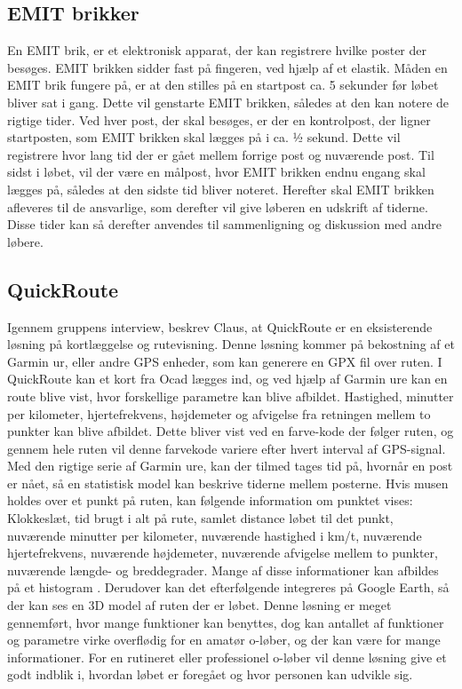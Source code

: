 \subsection{EMIT brikker}
En EMIT brik, er et elektronisk apparat, der kan registrere hvilke poster der besøges. EMIT brikken sidder fast på fingeren, ved hjælp af et elastik. \newline
Måden en EMIT brik fungere på, er at den stilles på en startpost ca. 5 sekunder før løbet bliver sat i gang. Dette vil genstarte EMIT brikken, således at den kan notere de rigtige tider. 
Ved hver post, der skal besøges, er der en kontrolpost, der ligner startposten, som EMIT brikken skal lægges på i ca. ½ sekund. Dette vil registrere hvor lang tid der er gået mellem forrige post og nuværende post. \newline
Til sidst i løbet, vil der være en målpost, hvor EMIT brikken endnu engang skal lægges på, således at den sidste tid bliver noteret. 
Herefter skal EMIT brikken afleveres til de ansvarlige, som derefter vil give løberen en udskrift af tiderne. Disse tider kan så derefter anvendes til sammenligning og diskussion med andre løbere. \citep{OOK}

\subsection{QuickRoute}
Igennem gruppens interview, beskrev Claus, at QuickRoute er en eksisterende løsning på kortlæggelse og rutevisning. Denne løsning kommer på bekostning af et Garmin ur, eller andre GPS enheder, som kan generere en GPX fil over ruten. I QuickRoute kan et kort fra Ocad lægges ind, og ved hjælp af Garmin ure kan en route blive vist, hvor forskellige parametre kan blive afbildet. Hastighed, minutter per kilometer, hjertefrekvens, højdemeter og afvigelse fra retningen mellem to punkter kan blive afbildet. Dette bliver vist ved en farve-kode der følger ruten, og gennem hele ruten vil denne farvekode variere efter hvert interval af GPS-signal. Med den rigtige serie af Garmin ure, kan der tilmed tages tid på, hvornår en post er nået, så en statistisk model kan beskrive tiderne mellem posterne. Hvis musen holdes over et punkt på ruten, kan følgende information om punktet vises: Klokkeslæt, tid brugt i alt på rute, samlet distance løbet til det punkt, nuværende minutter per kilometer, nuværende hastighed i km/t, nuværende hjertefrekvens, nuværende højdemeter, nuværende afvigelse mellem to punkter, nuværende længde- og breddegrader. Mange af disse informationer kan afbildes på et histogram \citep{QR}.\newline
Derudover kan det efterfølgende integreres på Google Earth, så der kan ses en 3D model af ruten der er løbet. 
Denne løsning er meget gennemført, hvor mange funktioner kan benyttes, dog kan antallet af funktioner og parametre virke overflødig for en amatør o-løber, og der kan være for mange informationer. For en rutineret eller professionel o-løber vil denne løsning give et godt indblik i, hvordan løbet er foregået og hvor personen kan udvikle sig.



